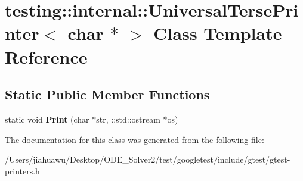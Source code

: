 \hypertarget{classtesting_1_1internal_1_1_universal_terse_printer_3_01char_01_5_01_4}{}\section{testing\+:\+:internal\+:\+:Universal\+Terse\+Printer$<$ char $\ast$ $>$ Class Template Reference}
\label{classtesting_1_1internal_1_1_universal_terse_printer_3_01char_01_5_01_4}
\subsection*{Static Public Member Functions}
\begin{DoxyCompactItemize}
\item 
\mbox{\label{classtesting_1_1internal_1_1_universal_terse_printer_3_01char_01_5_01_4_aa9ef95587c1461fe33e254af52401a43}} 
static void {\bfseries Print} (char $\ast$str, \+::std\+::ostream $\ast$os)
\end{DoxyCompactItemize}


The documentation for this class was generated from the following file\+:\begin{DoxyCompactItemize}
\item 
/\+Users/jiahuawu/\+Desktop/\+O\+D\+E\+\_\+\+Solver2/test/googletest/include/gtest/gtest-\/printers.\+h\end{DoxyCompactItemize}

